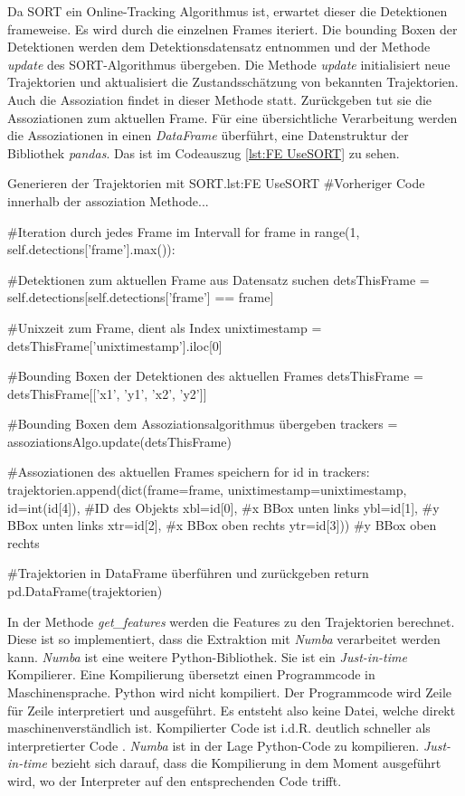 Da SORT ein Online-Tracking Algorithmus ist, erwartet dieser die Detektionen frameweise. Es wird durch die einzelnen Frames iteriert. Die bounding Boxen der Detektionen werden dem Detektionsdatensatz entnommen und der Methode \textit{update} des SORT-Algorithmus übergeben. Die Methode \textit{update} initialisiert neue Trajektorien und aktualisiert die Zustandsschätzung von bekannten Trajektorien. Auch die Assoziation findet in dieser Methode statt. Zurückgeben tut sie die Assoziationen zum aktuellen Frame. Für eine übersichtliche Verarbeitung werden die Assoziationen in einen \textit{DataFrame} überführt, eine Datenstruktur der Bibliothek \textit{pandas}. Das ist im Codeauszug \ref{lst:FE UseSORT} zu sehen.

\begin{pythoncode}{Generieren der Trajektorien mit SORT.}{lst:FE UseSORT}
#Vorheriger Code innerhalb der assoziation Methode...

#Iteration durch jedes Frame im Intervall
for frame in range(1, self.detections['frame'].max()):
    
    #Detektionen zum aktuellen Frame aus Datensatz suchen
    detsThisFrame = self.detections[self.detections['frame'] == frame]

    #Unixzeit zum Frame, dient als Index
    unixtimestamp = detsThisFrame['unixtimestamp'].iloc[0]

    #Bounding Boxen der Detektionen des aktuellen Frames
    detsThisFrame = detsThisFrame[['x1', 'y1', 'x2', 'y2']] 

    #Bounding Boxen dem Assoziationsalgorithmus übergeben
    trackers = assoziationsAlgo.update(detsThisFrame) 

    #Assoziationen des aktuellen Frames speichern 
    for id in trackers:
        trajektorien.append(dict(frame=frame,
                          unixtimestamp=unixtimestamp, 
                          id=int(id[4]),    #ID des Objekts
                          xbl=id[0],        #x BBox unten links
                          ybl=id[1],        #y BBox unten links
                          xtr=id[2],        #x BBox oben rechts
                          ytr=id[3]))       #y BBox oben rechts

    #Trajektorien in DataFrame überführen und zurückgeben
    return pd.DataFrame(trajektorien)
\end{pythoncode}

In der Methode \textit{get\_features} werden die Features zu den Trajektorien berechnet. Diese ist so implementiert, dass die Extraktion mit \textit{Numba} verarbeitet werden kann. \textit{Numba} ist eine weitere Python-Bibliothek. Sie ist ein \textit{\gls{Just-in-time}} Kompilierer. Eine Kompilierung übersetzt einen Programmcode in Maschinensprache. Python wird nicht kompiliert. Der Programmcode wird Zeile für Zeile interpretiert und ausgeführt. Es entsteht also keine Datei, welche direkt maschinenverständlich ist. Kompilierter Code ist i.d.R. deutlich schneller als interpretierter Code \cite{Scholz.2005}. \textit{Numba} ist in der Lage Python-Code zu kompilieren. \textit{Just-in-time} bezieht sich darauf, dass die Kompilierung in dem Moment ausgeführt wird, wo der Interpreter auf den entsprechenden Code trifft. \par

